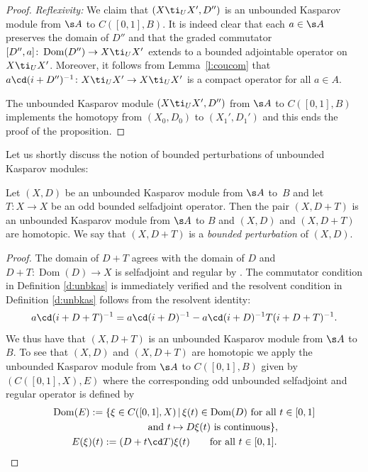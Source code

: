 \begin{proof}{\it Reflexivity:}
We claim that $(X \ti_U X',D'')$ is an unbounded Kasparov module from $\s A$ to $C([0,1],B)$. It is indeed clear that each $a \in \s A$ preserves the domain of $D''$ and that the graded commutator $[ D'', a ]\colon \operatorname{Dom}(D'') \to X \ti_U X'$ extends to a bounded adjointable operator on $X \ti_U X'$. Moreover, it follows from Lemma~\ref{l:coucom} that $a \cd (i + D'')^{-1}\colon X \ti_U X' \to X \ti_U X'$ is a compact operator for all $a \in A$.

The unbounded Kasparov module $(X \ti_U X',D'')$ from $\s A$ to $C( [0,1],B)$ implements the homotopy from $(X_0, D_0)$ to $(X_1',D_1')$ and this ends the proof of the proposition.
\end{proof}


Let us shortly discuss the notion of bounded perturbations of unbounded Kasparov modules:

\begin{dfnprop}\label{p:bddper}
Let $(X,D)$ be an unbounded Kasparov module from $\s A$ to~$B$ and let $T\colon X \to X$ be an odd bounded selfadjoint operator. Then the pair $(X, D + T)$ is an unbounded Kasparov module from $\s A$ to $B$ and $(X,D)$ and $(X, D + T)$ are homotopic. We say that $(X, D + T)$ is a \emph{bounded perturbation} of $(X,D)$.
\end{dfnprop}
\begin{proof}
The domain of $D + T$ agrees with the domain of $D$ and $D + T\colon \operatorname{Dom}(D) \to X$ is selfadjoint and regular by \cite[Example 1]{Wor:UAQ}. The commutator condition in Definition \ref{d:unbkas} is immediately verified and the resolvent condition in Definition \ref{d:unbkas} follows from the resolvent identity:
\[
a \cd (i + D + T)^{-1} = a \cd (i + D)^{-1} - a \cd (i + D)^{-1} T (i + D + T)^{-1} .
\]
We thus have that $(X, D + T)$ is an unbounded Kasparov module from $\s A$ to $B$. To see that $(X,D)$ and $(X, D + T)$ are homotopic we apply the unbounded Kasparov module from $\s A$ to $C( [0,1],B)$ given by $( C( [0,1],X), E)$ where the corresponding odd unbounded selfadjoint and regular operator is defined by
\begin{gather*}
\operatorname{Dom}(E) := \{ \xi \in C( [0,1],X) \,|\, \xi(t) \in \operatorname{Dom}(D) \ \text{for all} \ t \in [0,1] \\
\hphantom{\operatorname{Dom}(E) := \{}{} \text{and} \ t \mapsto D \xi(t) \ \text{is continuous} \},\\
E(\xi)(t) := (D + t \cd T)\xi(t) \qquad \text{for all } t \in [0,1] . \tag*{\qed}
\end{gather*}\renewcommand{\qed}{}
\end{proof}

